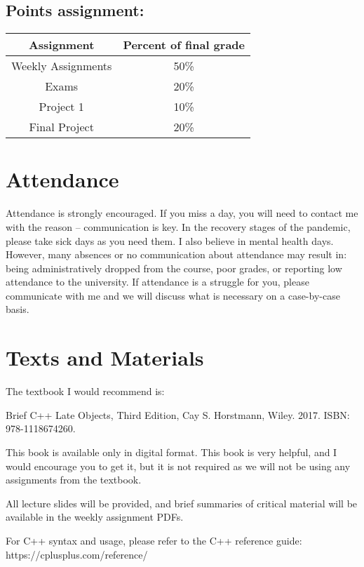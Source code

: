 \subsection{Points assignment:}
\begin{table}[H]
    \centering
    \begin{tabular}{|c|c|} \hline
         Assignment 	& Percent of final grade \\ \hline
        Weekly Assignments & 50\% \\
        Exams & 20\% \\
        Project 1 & 10\% \\
        Final Project & 20\% \\ \hline
    \end{tabular}
\end{table}

\section{Attendance}

Attendance is strongly encouraged. If you miss a day, you will need to contact me with the reason -- communication is key. In the recovery stages of the pandemic, please take sick days as you need them. I also believe in mental health days. However, many absences or no communication about attendance may result in: being administratively dropped from the course, poor grades, or reporting low attendance to the university. If attendance is a struggle for you, please communicate with me and we will discuss what is necessary on a case-by-case basis.

\section{Texts and Materials}

The textbook I would recommend is:

Brief C++ Late Objects, Third Edition, Cay S. Horstmann, Wiley. 2017. ISBN: 978-1118674260.

This book is available only in digital format. This book is very helpful, and I would encourage you to get it, but it is not required as we will not be using any assignments from the textbook.

All lecture slides will be provided, and brief summaries of critical material will be available in the weekly assignment PDFs. 

For C++ syntax and usage, please refer to the C++ reference guide: https://cplusplus.com/reference/

